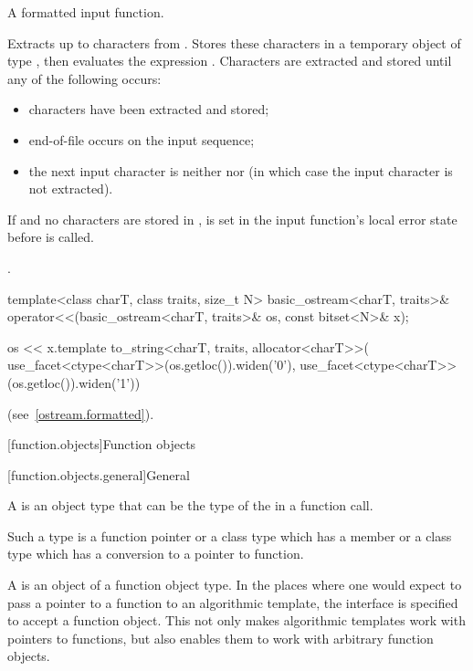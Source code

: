 \begin{itemdescr}
\pnum
A formatted input function.

\pnum
\effects
Extracts up to  characters from .
Stores these characters in a temporary object  of type
,
then evaluates the expression
.
Characters are extracted and stored until any of the following occurs:
\begin{itemize}
\item
{} characters have been extracted and stored;
\item
{}%
end-of-file occurs on the input sequence;
\item
the next input character is neither
nor
(in which case the input character is not extracted).
\end{itemize}

\pnum
If  and no characters are stored in ,
 is set in the input function's local error state
before  is called.

\pnum
\returns
{}.
\end{itemdescr}

%
\begin{itemdecl}
template<class charT, class traits, size_t N>
  basic_ostream<charT, traits>&
    operator<<(basic_ostream<charT, traits>& os, const bitset<N>& x);
\end{itemdecl}

\begin{itemdescr}
\pnum
\returns
\begin{codeblock}
os << x.template to_string<charT, traits, allocator<charT>>(
  use_facet<ctype<charT>>(os.getloc()).widen('0'),
  use_facet<ctype<charT>>(os.getloc()).widen('1'))
\end{codeblock}
(see~\ref{ostream.formatted}).
\end{itemdescr}

[function.objects]{Function objects}

[function.objects.general]{General}

\pnum
A  is an object
type that can be the type of the
in a function call.
\begin{footnote}
Such a type is a function
pointer or a class type which has a member  or a class type
which has a conversion to a pointer to function.
\end{footnote}
A  is an
object of a function object type. In the places where one would expect to pass a
pointer to a function to an algorithmic template, the
interface is specified to accept a function object. This not only makes
algorithmic templates work with pointers to functions, but also enables them to
work with arbitrary function objects.

